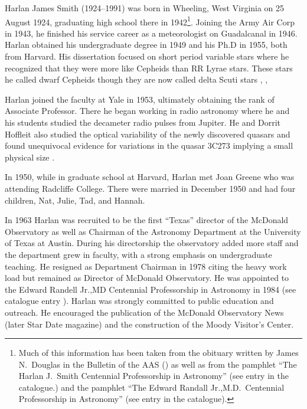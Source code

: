 
Harlan James Smith (1924--1991) was born in Wheeling, West Virginia on
25 August 1924, graduating high school there in 1942\footnote{Much of
this information has been taken from the obituary written by James
N.~Douglas in the Bulletin of the AAS (\cite{Douglas1992Harlan}) as
well as from the pamphlet ``The Harlan J.~Smith Centennial
Professorship in Astronomy'' (see entry  in the catalogue.)
and the pamphlet ``The Edward Randall Jr.,M.D.~Centennial
Professorship in Astronomy'' (see entry  in the
catalogue).}. Joining the Army Air Corp in 1943, he finished his
service career as a meteorologist on Guadalcanal in 1946.  Harlan
obtained his undergraduate degree in 1949 and his Ph.D in 1955, both
from Harvard. His dissertation focused on short period variable stars
where he recognized that they were more like Cepheids than RR Lyrae
stars.  These stars he called dwarf Cepheids though they are now
called delta Scuti stars \cite{HJS1955}, \cite{HJSPhD},

Harlan joined the faculty at Yale in 1953, ultimately obtaining the rank of
Associate Professor. There he began working in radio astronomy where
he and his students studied the decameter radio pulses from
Jupiter. He and Dorrit Hoffleit also studied the optical variability of
the newly discovered quasars and found unequivocal evidence for
variations in the quasar 3C273 implying a small physical size
\cite{HJS1963}.

In 1950, while in graduate school at Harvard, Harlan met Joan Greene
who was attending Radcliffe College. There were married in December
1950 and had four children, Nat, Julie, Tad, and Hannah.

In 1963 Harlan was recruited to be the first ``Texas'' director of the
McDonald Observatory as well as Chairman of the Astronomy Department
at the University of Texas at Austin. During his directorship the
observatory added more staff and the department grew in faculty, with
a strong emphasis on undergraduate teaching. He resigned as Department
Chairman in 1978 citing the heavy work load but remained as Director
of McDonald Observatory. He was appointed to the Edward Randell Jr.,MD
Centennial Professorship in Astronomy in 1984 (see catalogue
entry ).  Harlan was strongly committed to public education
and outreach.  He encouraged the publication of the McDonald
Observatory News (later Star Date magazine) and the construction of
the Moody Visitor's Center.

